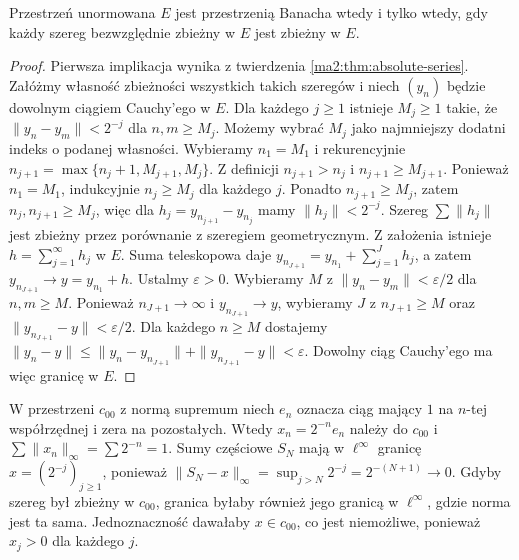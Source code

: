 \begin{twierdzenie}
\label{ma2:thm:series-completeness}
Przestrzeń unormowana $E$ jest przestrzenią Banacha wtedy
i tylko wtedy, gdy każdy szereg bezwzględnie zbieżny w $E$
jest zbieżny w $E$.
\end{twierdzenie}
\begin{proof}
Pierwsza implikacja wynika z twierdzenia \ref{ma2:thm:absolute-series}.
Załóżmy własność zbieżności wszystkich takich szeregów
i niech $(y_n)$ będzie dowolnym ciągiem Cauchy'ego w $E$.
Dla każdego $j\ge1$ istnieje $M_j\ge1$ takie, że
$\|y_n-y_m\|<2^{-j}$ dla $n,m\ge M_j$.
Możemy wybrać $M_j$ jako najmniejszy dodatni indeks
o podanej własności. Wybieramy $n_1=M_1$ i rekurencyjnie
$n_{j+1}=\max\{n_j+1,M_{j+1},M_j\}$.
Z definicji $n_{j+1}>n_j$ i $n_{j+1}\ge M_{j+1}$.
Ponieważ $n_1=M_1$, indukcyjnie $n_j\ge M_j$ dla każdego $j$.
Ponadto $n_{j+1}\ge M_j$, zatem $n_j,n_{j+1}\ge M_j$,
więc dla $h_j=y_{n_{j+1}}-y_{n_j}$ mamy $\|h_j\|<2^{-j}$.
Szereg $\sum\|h_j\|$ jest zbieżny przez porównanie
z szeregiem geometrycznym. Z założenia istnieje
$h=\sum_{j=1}^\infty h_j$ w $E$.
Suma teleskopowa daje $y_{n_{J+1}}=y_{n_1}+\sum_{j=1}^J h_j$,
a zatem $y_{n_{J+1}}\to y=y_{n_1}+h$.
Ustalmy $\varepsilon>0$. Wybieramy $M$ z
$\|y_n-y_m\|<\varepsilon/2$ dla $n,m\ge M$.
Ponieważ $n_{J+1}\to\infty$ i $y_{n_{J+1}}\to y$,
wybieramy $J$ z $n_{J+1}\ge M$ oraz
$\|y_{n_{J+1}}-y\|<\varepsilon/2$.
Dla każdego $n\ge M$ dostajemy
$\|y_n-y\|\le\|y_n-y_{n_{J+1}}\|+\|y_{n_{J+1}}-y\|<\varepsilon$.
Dowolny ciąg Cauchy'ego ma więc granicę w $E$.
\end{proof}

\begin{przyklad}
\label{ma2:ex:incomplete-series}
W przestrzeni $c_{00}$ z normą supremum niech $e_n$
oznacza ciąg mający $1$ na $n$-tej współrzędnej i zera na
pozostałych. Wtedy $x_n=2^{-n}e_n$ należy do $c_{00}$ i
$\sum\|x_n\|_\infty=\sum 2^{-n}=1$.
Sumy częściowe $S_N$ mają w $\ell^\infty$ granicę
$x=(2^{-j})_{j\ge1}$, ponieważ
$\|S_N-x\|_\infty=\sup_{j>N}2^{-j}=2^{-(N+1)}\to0$.
Gdyby szereg był zbieżny w $c_{00}$, granica byłaby
również jego granicą w $\ell^\infty$, gdzie norma jest ta sama.
Jednoznaczność dawałaby $x\in c_{00}$, co jest niemożliwe,
ponieważ $x_j>0$ dla każdego $j$.
\end{przyklad}

